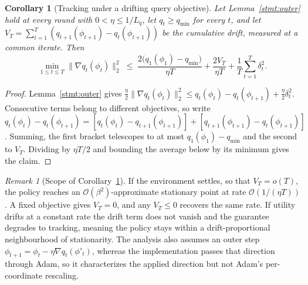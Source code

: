 \documentclass[journal]{IEEEtran}
\newtheorem{corollary}{Corollary}
\theoremstyle{remark}
\newtheorem{remark}{Remark}
\newcommand{\revtwo}[1]{#1}
\newcommand{\revtwoeq}{}
\begin{document}
{\begin{corollary}[\revtwo{Tracking under a drifting query objective}]\label{cor:rate}
\revtwo{Let Lemma~\ref{stmt:outer} hold at every round with $0<\eta\le 1/L_q$, let $q_t\ge q_{\min}$ for every $t$, and let $V_T=\sum_{t=1}^{T}(q_{t+1}(\phi_{t+1})-q_t(\phi_{t+1}))$ be the cumulative drift, measured at a common iterate. Then}
\[
\revtwoeq \min_{1\le t\le T}\lVert\nabla q_t(\phi_t)\rVert_2^2\;\le\;
\frac{2\bigl(q_1(\phi_1)-q_{\min}\bigr)}{\eta T}+\frac{2V_T}{\eta T}+\frac{1}{T}\sum_{t=1}^{T}\delta_t^2 .
\]
\end{corollary}
\begin{proof}
\revtwo{Lemma~\ref{stmt:outer} gives $\tfrac{\eta}{2}\lVert\nabla q_t(\phi_t)\rVert_2^2\le q_t(\phi_t)-q_t(\phi_{t+1})+\tfrac{\eta}{2}\delta_t^2$. Consecutive terms belong to different objectives, so write $q_t(\phi_t)-q_t(\phi_{t+1})=[q_t(\phi_t)-q_{t+1}(\phi_{t+1})]+[q_{t+1}(\phi_{t+1})-q_t(\phi_{t+1})]$. Summing, the first bracket telescopes to at most $q_1(\phi_1)-q_{\min}$ and the second to $V_T$. Dividing by $\eta T/2$ and bounding the average below by its minimum gives the claim.}
\end{proof}

\begin{remark}[\revtwo{Scope of Corollary~\ref{cor:rate}}]\label{rem:reading}
\revtwo{If the environment settles, so that $V_T=o(T)$, the policy reaches an $\mathcal{O}(\beta^2)$-approximate stationary point at rate $\mathcal{O}(1/(\eta T))$. A fixed objective gives $V_T=0$, and any $V_T\le 0$ recovers the same rate. If utility drifts at a constant rate the drift term does not vanish and the guarantee degrades to tracking, meaning the policy stays within a drift-proportional neighbourhood of stationarity. The analysis also assumes an outer step $\phi_{t+1}=\phi_t-\eta\nabla q_t(\phi'_t)$, whereas the implementation passes that direction through Adam, so it characterizes the applied direction but not Adam's per-coordinate rescaling.}
\end{remark}
\color{black}
}
\end{document}
